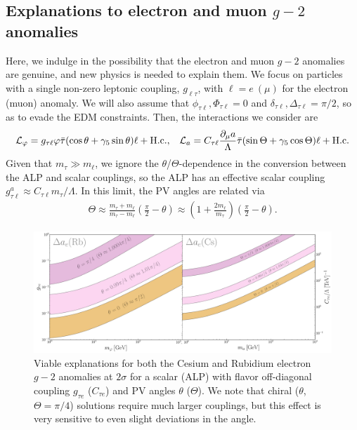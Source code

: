 {\subsection{Explanations to electron and muon $g-2$ anomalies}\label{sec:g-2_explanation}
Here, we indulge in the possibility that the electron and muon $g-2$ anomalies are genuine, and new physics is needed to explain them. We focus on particles with a single non-zero leptonic coupling, $g_{\ell\tau}$, with $\ell = e~(\mu)$ for the electron (muon) anomaly. We will also assume that $\phi_{\tau\ell},\Phi_{\tau\ell} = 0$ and $\delta_{\tau\ell},\Delta_{\tau\ell} = \pi/2$, so as to evade the EDM constraints. Then, the interactions we consider are
\begin{align}
    {\cal L}_{\varphi} = g_{\tau \ell}\varphi\bar{\tau}(\cos{\theta} + \gamma_5\sin{\theta})\ell + {\rm H.c.}, && {\cal L}_a = C_{\tau \ell}\frac{\partial_\mu a}{\Lambda}\bar{\tau}(\sin{\Theta} + \gamma_5\cos{\Theta})\ell + {\rm H.c.}
\end{align}
Given that $m_\tau \gg m_\ell$, we ignore the $\theta$/$\Theta$-dependence in the conversion between the ALP and scalar couplings, so the ALP has an effective scalar coupling $g_{\tau \ell}^a \approx C_{\tau \ell}m_\tau / \Lambda$. In this limit, the PV angles are related via 
\begin{align}
    \Theta \approx \frac{m_\tau + m_\ell}{m_\tau - m_\ell}\left(\frac{\pi}{2} - \theta\right) \approx \left(1 + \frac{2m_\ell}{m_\tau}\right)\left(\frac{\pi}{2} - \theta\right).
\end{align}
\begin{figure}[t!]
    \centering
    \includegraphics[width=\linewidth]{figures/chapter3/scalar_ALP_electron_g_2.pdf}
    \caption[LFV scalar and ALP explanations to electron $g-2$ anomalies.]{Viable explanations for both the Cesium and Rubidium electron $g-2$ anomalies at $2\sigma$ for a scalar (ALP) with flavor off-diagonal coupling $g_{\tau e}$ ($C_{\tau e}$) and PV angles $\theta$ ($\Theta$). We note that chiral ($\theta$, $\Theta = \pi/4$) solutions require much larger couplings, but this effect is very sensitive to even slight deviations in the angle.}

\end{figure}}
